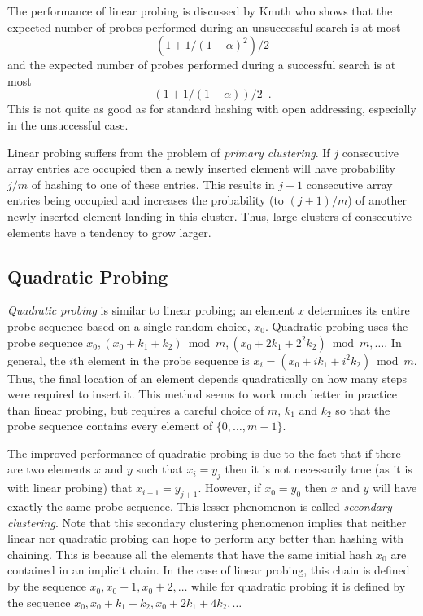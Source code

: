 The performance of linear probing is discussed by Knuth \cite{k97} who
shows that the expected number of probes performed during an
unsuccessful search is at most 
\[
	(1+1/(1-\alpha)^2)/2
\] 
and the expected
number of probes performed during a successful search is at most
\[
	(1+1/(1-\alpha))/2 \enspace . 
\] 
This is not quite as good as for standard hashing with open
addressing, especially in the unsuccessful case.

Linear probing suffers from the problem of \emph{primary
clustering}.  If
$j$ consecutive array entries are occupied then a newly inserted
element will have probability $j/m$ of hashing to one of these
entries. This results in $j+1$ consecutive array entries being
occupied and increases the probability (to $(j+1)/m$) of another newly
inserted element landing in this cluster.  Thus, large clusters of
consecutive elements have a tendency to grow larger.

\subsection{Quadratic Probing}

\emph{Quadratic probing} is similar to linear probing;  an element $x$
determines its entire probe sequence based on a single random choice,
$x_0$.  Quadratic probing uses the probe sequence
$x_0,(x_0+k_1+k_2)\bmod m, (x_0+2k_1+2^2k_2)\bmod m,\ldots$.  In
general, the $i$th element in the probe sequence is
$x_i=(x_0+ik_1+i^2k_2)\bmod m$.  Thus, the final location of an
element depends quadratically on how many steps were required to
insert it.  This method seems to work much better in practice than
linear probing, but requires a careful choice of $m$, $k_1$ and $k_2$
so that the probe sequence contains every element of $\{0,\ldots,m-1\}$.

The improved performance of quadratic probing is due to the fact that
if there are two elements $x$ and $y$ such that $x_i=y_j$ then it is
not necessarily true (as it is with linear probing) that
$x_{i+1}=y_{j+1}$.  However, if $x_0=y_0$ then $x$ and $y$ will have
exactly the same probe sequence.  This lesser phenomenon is called
\emph{secondary clustering}.  Note that this secondary
clustering phenomenon implies that neither linear nor quadratic
probing can hope to perform any better than hashing with chaining.
This is because all the elements that have the same initial hash $x_0$
are contained in an implicit chain.  In the case of linear probing,
this chain is defined by the sequence $x_0,x_0+1,x_0+2,\ldots$ while
for quadratic probing it is defined by the sequence
$x_0,x_0+k_1+k_2,x_0+2k_1+4k_2,\ldots$

